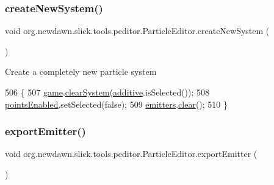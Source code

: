 \subsubsection{\texorpdfstring{create\+New\+System()}{createNewSystem()}}
{\footnotesize\ttfamily void org.\+newdawn.\+slick.\+tools.\+peditor.\+Particle\+Editor.\+create\+New\+System (\begin{DoxyParamCaption}{ }\end{DoxyParamCaption})\hspace{0.3cm}{\ttfamily [inline]}}

Create a completely new particle system 
\begin{DoxyCode}
506                                   \{
507         \mbox{\hyperlink{classorg_1_1newdawn_1_1slick_1_1tools_1_1peditor_1_1_particle_editor_a30ffb1c9b34c421c0ef6a28efbaaa450}{game}}.\mbox{\hyperlink{classorg_1_1newdawn_1_1slick_1_1tools_1_1peditor_1_1_particle_game_a35c4aec3f19a81ace80cd0ba3929680d}{clearSystem}}(\mbox{\hyperlink{classorg_1_1newdawn_1_1slick_1_1tools_1_1peditor_1_1_particle_editor_a0d9d0e20f004cbd5e65f148b99b63093}{additive}}.isSelected());
508         \mbox{\hyperlink{classorg_1_1newdawn_1_1slick_1_1tools_1_1peditor_1_1_particle_editor_a06e9238557a48255d04a41dc2fba3b6f}{pointsEnabled}}.setSelected(\textcolor{keyword}{false});
509         \mbox{\hyperlink{classorg_1_1newdawn_1_1slick_1_1tools_1_1peditor_1_1_particle_editor_adf3a8d24a0adf9e68e06a87f37ff378a}{emitters}}.\mbox{\hyperlink{classorg_1_1newdawn_1_1slick_1_1tools_1_1peditor_1_1_emitter_list_ae05eade7e60681dcd66ec02b53c1b813}{clear}}();
510     \}
\end{DoxyCode}
\mbox{\label{classorg_1_1newdawn_1_1slick_1_1tools_1_1peditor_1_1_particle_editor_adb6089bb9e66a806b8396859cf45a319}} 
\subsubsection{\texorpdfstring{export\+Emitter()}{exportEmitter()}}
{\footnotesize\ttfamily void org.\+newdawn.\+slick.\+tools.\+peditor.\+Particle\+Editor.\+export\+Emitter (\begin{DoxyParamCaption}{ }\end{DoxyParamCaption})\hspace{0.3cm}{\ttfamily [inline]}}

